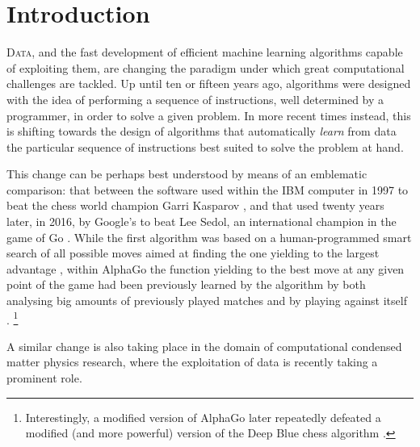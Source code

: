 \chapter{Introduction}

\lettrine{D}{ata}, and the fast development of efficient machine learning algorithms capable of exploiting them, are changing the paradigm under which great computational challenges are tackled. 
%
Up until ten or fifteen years ago, algorithms were designed with the idea of performing a sequence of instructions, well determined by a programmer, in order to solve a given problem. 
%
In more recent times instead, this  is shifting towards the design of algorithms that automatically \emph{learn} from data the particular sequence of instructions best suited to solve the problem at hand. 
%


This change can be perhaps best understood by means of an emblematic comparison: that between the software used within the IBM  computer in 1997 to beat the chess world  champion Garri Kasparov \citep{DeepBlue_theguardian}, and that used twenty years later, in 2016, by Google's  to beat Lee Sedol, an international champion in the game of Go \citep{AlphaGo_theguardian}.
%
While the first algorithm was based on a human-programmed smart search of all possible moves aimed at finding the one yielding to the largest advantage \citep{Russell:2002fe,Micro:gx,Hsu:2004wo}, within AlphaGo the function yielding to the best move at any given point of the game had been previously learned by the algorithm by both analysing big amounts of previously played matches and by playing against itself \citep{Silver:2016hl}. 
%
\footnote{Interestingly, a modified version of AlphaGo later repeatedly defeated a modified (and more powerful) version of the Deep Blue chess algorithm \citep{Silver:2017wu}.}


A similar change is also taking place in the domain of computational condensed matter physics research, where the exploitation of data is recently taking a prominent role.





